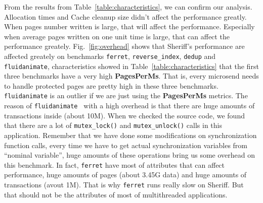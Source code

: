 From the results from Table~\ref{table:characteristics}, we can confirm our analysis. 
Allocation times and Cache cleanup size didn't affect the performance greatly. 
When pages number written is large, that will affect the performance.
Especially when average pages written on one unit time is large, that can affect the performance greately.
Fig.~\ref{fig:overhead} shows that Sheriff's performance are affected greately 
on benchmarks \texttt{ferret}, \texttt{reverse\_index}, \texttt{dedup} and \texttt{fluidanimate}, 
characteristics showed in Table~\ref{table:characteristics} that the first three benchmarks 
have a very high \textbf{PagesPerMs}. That is, every microsend 
needs to handle protected pages are pretty high in these three benchmarks. 
\texttt{fluidanimate} is an outlier if we are just using the \textbf{PagesPerMs} metrics. 
The reason of \texttt{fluidanimate } with a high overhead is that there are huge amounts of transactions inside (about 10M). 
When we checked the source code, we found that there are a lot of \texttt{mutex\_lock()}
and \texttt{mutex\_unlock()} calls in this application.
Remember that we have done some modifications on synchronization function calls, every time we have to get actual 
synchronization variables from ``nominal variable'', huge amounts of these operations bring us some overhead on this benchmark.
In fact, \texttt{ferret} have most of attributes that can affect performance, huge amounts of pages (about 3.45G data) and huge 
amounts of transactions (avout 1M). That is why \texttt{ferret} runs really slow on Sheriff.
But that should not be the attributes of most of multithreaded applications.

